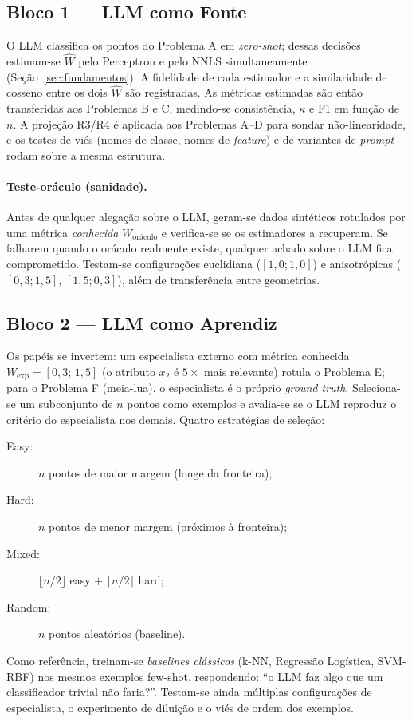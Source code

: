 \documentclass[12pt,a4paper]{article}
\newcommand{\West}{\ensuremath{\hat{W}}}   %
\begin{document}
\subsection{Bloco 1 — LLM como Fonte}

O LLM classifica os pontos do Problema A em \emph{zero-shot}; dessas decisões estimam-se
\West{} pelo Perceptron e pelo NNLS simultaneamente (Seção~\ref{sec:fundamentos}). A
fidelidade de cada estimador e a similaridade de cosseno entre os dois \West{} são
registradas. As métricas estimadas são então transferidas aos Problemas B e C, medindo-se
consistência, $\kappa$ e F1 em função de $n$. A projeção R3/R4 é aplicada aos Problemas A–D
para sondar não-linearidade, e os testes de viés (nomes de classe, nomes de \emph{feature})
e de variantes de \emph{prompt} rodam sobre a mesma estrutura.

\paragraph{Teste-oráculo (sanidade).}
Antes de qualquer alegação sobre o LLM, geram-se dados sintéticos rotulados por uma métrica
\emph{conhecida} $W_{\text{oráculo}}$ e verifica-se se os estimadores a recuperam. Se
falharem quando o oráculo realmente existe, qualquer achado sobre o LLM fica comprometido.
Testam-se configurações euclidiana ($[1{,}0;1{,}0]$) e anisotrópicas ($[0{,}3;1{,}5]$,
$[1{,}5;0{,}3]$), além de transferência entre geometrias.

\subsection{Bloco 2 — LLM como Aprendiz}

Os papéis se invertem: um especialista externo com métrica conhecida
$W_{\text{exp}} = [0{,}3;\,1{,}5]$ (o atributo $x_2$ é $5\times$ mais relevante) rotula o
Problema E; para o Problema F (meia-lua), o especialista é o próprio \emph{ground truth}.
Seleciona-se um subconjunto de $n$ pontos como exemplos e avalia-se se o LLM reproduz o
critério do especialista nos demais. Quatro estratégias de seleção:
\begin{description}
  \item[Easy:] $n$ pontos de maior margem (longe da fronteira);
  \item[Hard:] $n$ pontos de menor margem (próximos à fronteira);
  \item[Mixed:] $\lfloor n/2 \rfloor$ easy $+$ $\lceil n/2 \rceil$ hard;
  \item[Random:] $n$ pontos aleatórios (baseline).
\end{description}
Como referência, treinam-se \emph{baselines clássicos} (k-NN, Regressão Logística, SVM-RBF)
nos mesmos exemplos few-shot, respondendo: ``o LLM faz algo que um classificador trivial não
faria?''. Testam-se ainda múltiplas configurações de especialista, o experimento de diluição
e o viés de ordem dos exemplos.
\end{document}
